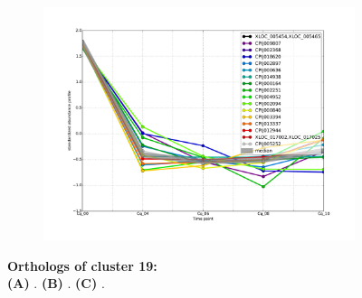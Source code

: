 \begin{figure}[hp]
\begin{subfigure}[t]{.7\linewidth}
\includegraphics[width=\linewidth]{figures/figs/ecr_and_insects_ptci_20130903/downAt4_gene_profiles_from_cummerbund/Cq_downAt4_cls19_Ag_target_FPKMs_vb_orthos.pdf}
\caption{}
\label{fig:cluster19-Cq}
\end{subfigure}
% 
\caption[Orthologs of cluster 19]{\sf \textbf{Orthologs of cluster 19:}\\

\textbf{(A)} \Aa.
\textbf{(B)} \Ag.
\textbf{(C)} \Cq.
}
\label{fig:cluster19}
\end{figure}